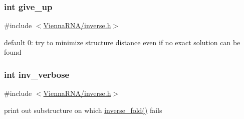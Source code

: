 \subsubsection[{\texorpdfstring{give\+\_\+up}{give_up}}]{\setlength{\rightskip}{0pt plus 5cm}int give\+\_\+up}\hypertarget{group__inverse__fold_ga7ec4ba51f86e1717a1e174264e4a75ce}{}\label{group__inverse__fold_ga7ec4ba51f86e1717a1e174264e4a75ce}


{\ttfamily \#include $<$\hyperlink{inverse_8h}{Vienna\+R\+N\+A/inverse.\+h}$>$}

default 0\+: try to minimize structure distance even if no exact solution can be found 
\subsubsection[{\texorpdfstring{inv\+\_\+verbose}{inv_verbose}}]{\setlength{\rightskip}{0pt plus 5cm}int inv\+\_\+verbose}\hypertarget{group__inverse__fold_gafcfc65fba01b9cca5946726ed9057a63}{}\label{group__inverse__fold_gafcfc65fba01b9cca5946726ed9057a63}


{\ttfamily \#include $<$\hyperlink{inverse_8h}{Vienna\+R\+N\+A/inverse.\+h}$>$}

print out substructure on which \hyperlink{group__inverse__fold_ga7af026de55d4babad879f2c92559cbbc}{inverse\+\_\+fold()} fails 